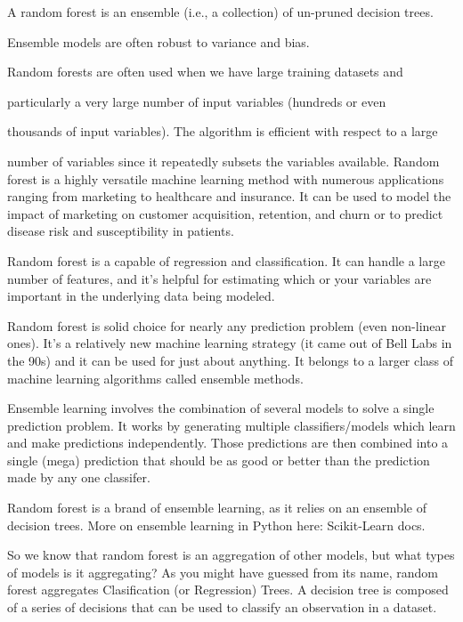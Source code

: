 \documentclass[11pt]{article} %
\begin{document}
A random forest is an ensemble (i.e., a collection) of un-pruned decision trees. 



Ensemble models are often robust to variance and bias.



Random forests are often used when we have large training datasets and



particularly a very large number of input variables (hundreds or even



thousands of input variables). The algorithm is efficient with respect to a large 



number of variables since it repeatedly subsets the variables available.
\bigskip
Random forest is a highly versatile machine learning method with numerous applications ranging from marketing to healthcare and insurance. It can be used to model the impact of marketing on customer acquisition, retention, and churn or to predict disease risk and susceptibility in patients.

Random forest is a capable of regression and classification. It can handle a large number of features, and it's helpful for estimating which or your variables are important in the underlying data being modeled.

Random forest is solid choice for nearly any prediction problem (even non-linear ones). It's a relatively new machine learning strategy (it came out of Bell Labs in the 90s) and it can be used for just about anything. It belongs to a larger class of machine learning algorithms called ensemble methods.


Ensemble learning involves the combination of several models to solve a single prediction problem. It works by generating multiple classifiers/models which learn and make predictions independently. Those predictions are then combined into a single (mega) prediction that should be as good or better than the prediction made by any one classifer.

Random forest is a brand of ensemble learning, as it relies on an ensemble of decision trees. More on ensemble learning in Python here: Scikit-Learn docs.

So we know that random forest is an aggregation of other models, but what types of models is it aggregating? As you might have guessed from its name, random forest aggregates Clasification (or Regression) Trees. A decision tree is composed of a series of decisions that can be used to classify an observation in a dataset.
\end{document}
